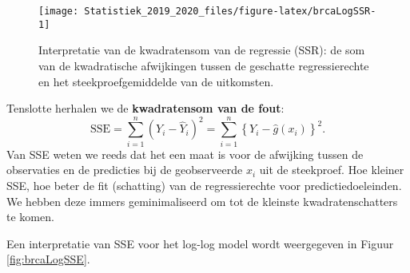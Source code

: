 \documentclass[12pt,dutch,coursenotes]{book}
\newenvironment{Shaded}{\begin{snugshade}}{\end{snugshade}}
\newcommand{\KeywordTok}[1]{\textcolor[rgb]{0.13,0.29,0.53}{\textbf{#1}}}
\newcommand{\DataTypeTok}[1]{\textcolor[rgb]{0.13,0.29,0.53}{#1}}
\newcommand{\DecValTok}[1]{\textcolor[rgb]{0.00,0.00,0.81}{#1}}
\newcommand{\FloatTok}[1]{\textcolor[rgb]{0.00,0.00,0.81}{#1}}
\newcommand{\StringTok}[1]{\textcolor[rgb]{0.31,0.60,0.02}{#1}}
\newcommand{\ControlFlowTok}[1]{\textcolor[rgb]{0.13,0.29,0.53}{\textbf{#1}}}
\newcommand{\OperatorTok}[1]{\textcolor[rgb]{0.81,0.36,0.00}{\textbf{#1}}}
\newcommand{\NormalTok}[1]{#1}
\theoremstyle{definition}
\theoremstyle{definition}
\theoremstyle{definition}
\theoremstyle{remark}
\begin{document}
\begin{figure}

{\centering \texttt{[image: Statistiek\_2019\_2020\_files/figure-latex/brcaLogSSR-1]} 

}

\caption{Interpretatie van de kwadratensom van de regressie (SSR): de som van de kwadratische afwijkingen tussen de geschatte regressierechte en het steekproefgemiddelde van de uitkomsten.}\label{fig:brcaLogSSR}
\end{figure}

Tenslotte herhalen we de \textbf{kwadratensom van de fout}:
\[ \text{SSE} = \sum_{i=1}^n (Y_i-\hat{Y}_i )^2 = \sum_{i=1}^n \left\{Y_i-\hat{g}\left(x_i\right)\right\}^2.\]
Van SSE weten we reeds dat het een maat is voor de afwijking tussen de
observaties en de predicties bij de geobserveerde \(x_i\) uit de
steekproef. Hoe kleiner SSE, hoe beter de fit (schatting) van de
regressierechte voor predictiedoeleinden. We hebben deze immers
geminimaliseerd om tot de kleinste kwadratenschatters te komen.

Een interpretatie van SSE voor het log-log model wordt weergegeven in
Figuur \ref{fig:brcaLogSSE}.

\begin{Shaded}
\end{Shaded}
\end{document}
